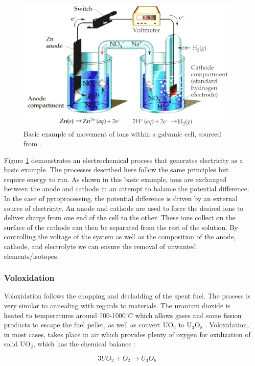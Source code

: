 \begin{figure}[h]
	\centering
	\includegraphics[width=0.8\linewidth]{images/electrochem}
	\caption{Basic example of movement of ions within a galvanic cell, sourced from \cite{angel}.}
	\label{fig:electrochem}
\end{figure}

Figure \ref{fig:electrochem} demonstrates an electrochemical process that generates electricity as a basic example.
The processes described here follow the same principles but require energy to run.
As shown in this basic example, ions are exchanged between the anode and cathode in an attempt to balance the potential difference.
In the case of pyroprocessing, the potential difference is driven by an external source of electricity.
An anode and cathode are used to force the desired ions to deliver charge from one end of the cell to the other.
These ions collect on the surface of the cathode can then be separated from the rest of the solution.
By controlling the voltage of the system as well as the composition of the anode, cathode, and electrolyte we can ensure the removal of unwanted elements/isotopes.


\subsubsection{Voloxidation}
Voloxidation follows the chopping and decladding of the spent fuel. The process is very similar to annealing with regards to materials. The uranium dioxide is heated to temperatures around 700-1000$^\circ C$ which allows gases and some fission products to escape the fuel pellet, as well as convert UO$_2$ to U$_3$O$_8$ \cite{organisation}. Voloxidation, in most cases, takes place in air which provides plenty of oxygen for oxidization of solid UO$_2$, which has the chemical balance \cite{jubin_spent_2009}:

\[ 3UO_2 + O_2 \rightarrow U_3O_8 \]

